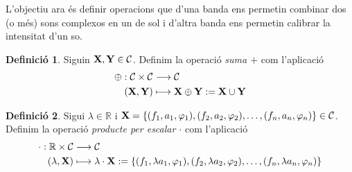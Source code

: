 \documentclass{article}
\theoremstyle{definition}
\newtheorem{definition}{Definició}[section]
\newcommand\quot[2]{
    \mathchoice
        {%
        \text{\raise1ex\hbox{$#1$}\!\Big/\!\lower1ex\hbox{$#2$}}}
        {%
            #1/#2}
        {%
            #1/#2}
        {%
            #1/#2}
}%
\newcommand{\0}{\ensuremath{\vb{0}}}
\newcommand{\X}{\ensuremath{\vb{X}}}
\newcommand{\Y}{\ensuremath{\vb{Y}}}
\newcommand{\RR}{\ensuremath{\mathbb{R}}} %
\begin{document}
L'objectiu ara és definir operacions que d'una banda ens permetin combinar dos (o més) sons complexos en un de sol i d'altra banda ens permetin calibrar la intensitat d'un so.
\begin{definition}
    Siguin $\X,\Y\in\mathcal{C}$. Definim la operació \textit{suma $+$} com l'aplicació
    \begin{align*}
        \oplus:\mathcal{C}\times\mathcal{C}&\longrightarrow\mathcal{C}\\
        (\X,\Y)&\longmapsto \X\oplus \Y:=\X\cup \Y
    \end{align*}
\end{definition}
\begin{definition}
    Sigui $\lambda\in\RR$ i $\X=\{(f_1,a_1,\varphi_1),(f_2,a_2,\varphi_2),\ldots,(f_n,a_n,\varphi_n)\}\in\mathcal{C}$. Definim la operació \textit{producte per escalar $\cdot$} com l'aplicació
    \begin{align*}
        \cdot:\RR\times\mathcal{C}&\longrightarrow\mathcal{C}\\
        (\lambda,\X)&\longmapsto \lambda\cdot \X:=\{(f_1,\lambda a_1,\varphi_1),(f_2,\lambda a_2,\varphi_2),\ldots,(f_n,\lambda a_n,\varphi_n)\}
    \end{align*}
\end{definition}
\end{document}
